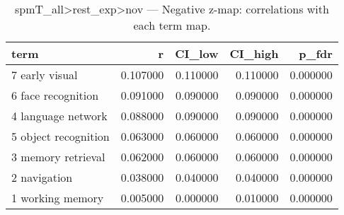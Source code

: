 \begin{table}
\caption{spmT_all>rest_exp>nov — Negative z-map: correlations with each term map.}
\label{tab:spmT_all>rest_exp>nov_neg}
\begin{tabular}{lrrrr}
\toprule
term & r & CI\_low & CI\_high & p\_fdr \\
\midrule
7 early visual & 0.107000 & 0.110000 & 0.110000 & 0.000000 \\
6 face recognition & 0.091000 & 0.090000 & 0.090000 & 0.000000 \\
4 language network & 0.088000 & 0.090000 & 0.090000 & 0.000000 \\
5 object recognition & 0.063000 & 0.060000 & 0.060000 & 0.000000 \\
3 memory retrieval & 0.062000 & 0.060000 & 0.060000 & 0.000000 \\
2 navigation & 0.038000 & 0.040000 & 0.040000 & 0.000000 \\
1 working memory & 0.005000 & 0.000000 & 0.010000 & 0.000000 \\
\bottomrule
\end{tabular}
\end{table}
